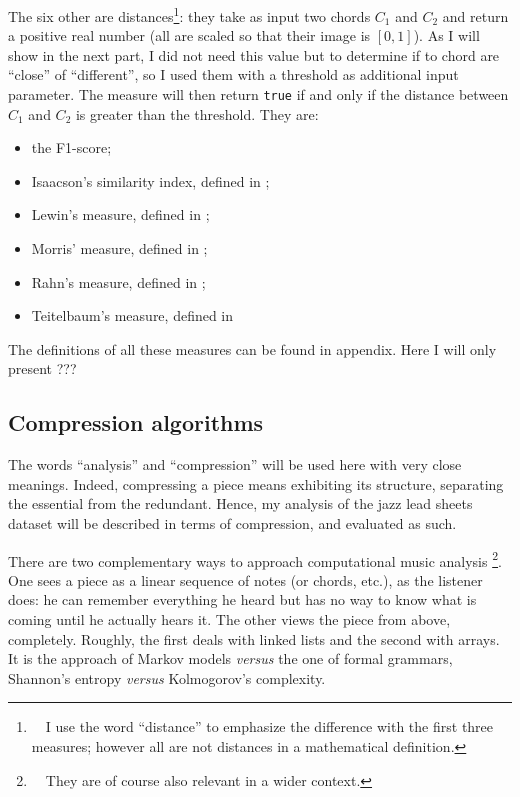 \documentclass[a4paper,10pt]{article}
\newcommand{\guill}[1]{``#1''}
\begin{document}
The six other are distances\footnote{~~I use the word \guill{distance} to emphasize the difference with the first three measures; however all are not distances in a mathematical definition.}: they take as input two chords $C_1$ and $C_2$ and return a positive real number (all are scaled so that their image is $[0,1]$). As I will show in the next part, I did not need this value but to determine if to chord are \guill{close} of \guill{different}, so I used them with a threshold as additional input parameter. The measure will then return \texttt{true} if and only if the distance between $C_1$ and $C_2$ is greater than the threshold. They are:
\begin{itemize}
\item the F1-score;
\item Isaacson's similarity index, defined in \cite{isaacson};
\item Lewin's measure, defined in \cite{lewin};
\item Morris' measure, defined in \cite{morris};
\item Rahn's measure, defined in \cite{rahn};
\item Teitelbaum's measure, defined in \cite{teitelbaum}
\end{itemize}

The definitions of all these measures can be found in appendix. Here I will only present ???


\subsection{Compression algorithms}

The words \guill{analysis} and \guill{compression} will be used here with very close meanings. Indeed, compressing a piece means exhibiting its structure, separating the essential from the redundant. Hence, my analysis of the jazz lead sheets dataset will be described in terms of compression, and evaluated as such.

There are two complementary ways to approach computational music analysis
\footnote{~~They are of course also relevant in a wider context.}. 
One sees a piece as a linear sequence of notes (or chords, etc.), as the listener does: he can remember everything he heard but has no way to know what is coming until he actually hears it. The other views the piece from above, completely. Roughly, the first deals with linked lists and the second with arrays. It is the approach of Markov models \emph{versus} the one of formal grammars, Shannon's entropy \emph{versus} Kolmogorov's complexity.
\end{document}
